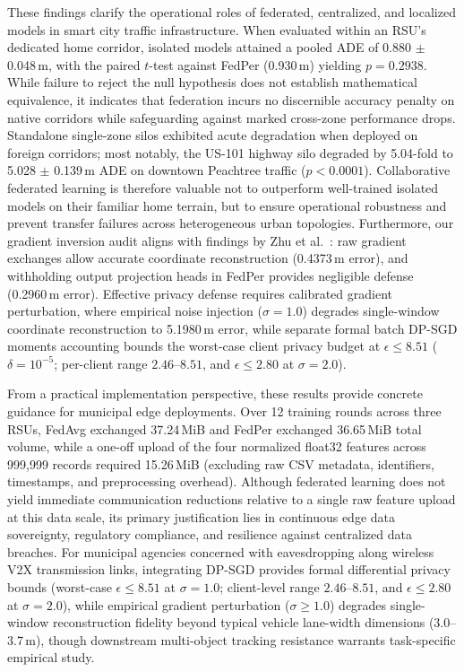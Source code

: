 \documentclass[journal]{IEEEtran}
\begin{document}
These findings clarify the operational roles of federated, centralized, and localized models in smart city traffic infrastructure. When evaluated within an RSU's dedicated home corridor, isolated models attained a pooled ADE of 0.880 $\pm$ 0.048\,m, with the paired $t$-test against FedPer (0.930\,m) yielding $p=0.2938$. While failure to reject the null hypothesis does not establish mathematical equivalence, it indicates that federation incurs no discernible accuracy penalty on native corridors while safeguarding against marked cross-zone performance drops. Standalone single-zone silos exhibited acute degradation when deployed on foreign corridors; most notably, the US-101 highway silo degraded by 5.04-fold to 5.028 $\pm$ 0.139\,m ADE on downtown Peachtree traffic ($p < 0.0001$). Collaborative federated learning is therefore valuable not to outperform well-trained isolated models on their familiar home terrain, but to ensure operational robustness and prevent transfer failures across heterogeneous urban topologies. Furthermore, our gradient inversion audit aligns with findings by Zhu et al.~\cite{zhu2019deep}: raw gradient exchanges allow accurate coordinate reconstruction (0.4373\,m error), and withholding output projection heads in FedPer provides negligible defense (0.2960\,m error). Effective privacy defense requires calibrated gradient perturbation, where empirical noise injection ($\sigma=1.0$) degrades single-window coordinate reconstruction to 5.1980\,m error, while separate formal batch DP-SGD moments accounting bounds the worst-case client privacy budget at $\epsilon \le 8.51$ ($\delta=10^{-5}$; per-client range $2.46$--$8.51$, and $\epsilon \le 2.80$ at $\sigma=2.0$).

From a practical implementation perspective, these results provide concrete guidance for municipal edge deployments. Over 12 training rounds across three RSUs, FedAvg exchanged 37.24\,MiB and FedPer exchanged 36.65\,MiB total volume, while a one-off upload of the four normalized float32 features across 999,999 records required 15.26\,MiB (excluding raw CSV metadata, identifiers, timestamps, and preprocessing overhead). Although federated learning does not yield immediate communication reductions relative to a single raw feature upload at this data scale, its primary justification lies in continuous edge data sovereignty, regulatory compliance, and resilience against centralized data breaches. For municipal agencies concerned with eavesdropping along wireless V2X transmission links, integrating DP-SGD provides formal differential privacy bounds (worst-case $\epsilon \le 8.51$ at $\sigma = 1.0$; client-level range $2.46$--$8.51$, and $\epsilon \le 2.80$ at $\sigma=2.0$), while empirical gradient perturbation ($\sigma \ge 1.0$) degrades single-window reconstruction fidelity beyond typical vehicle lane-width dimensions (3.0--3.7\,m), though downstream multi-object tracking resistance warrants task-specific empirical study.
\end{document}
